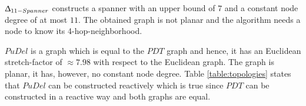$\Updelta _{11-Spanner} $ \cite{Kanj2012} constructs a spanner with an upper bound of $7 $ and a constant node degree of at most $11 $.
The obtained graph is not planar and the algorithm needs a node to know its 4-hop-neighborhood.

$PuDel $ \cite{Xu2011} is a graph which is equal to the $PDT $ graph \cite{Neumann2012} and hence, it has an Euclidean stretch-factor of $\approx 7.98 $ with respect to the Euclidean graph.
The graph is planar, it has, however, no constant node degree. 
Table \ref{table:topologies} states that $PuDel $ can be constructed reactively which is true since $PDT $ can be constructed in a reactive way and both graphs are equal.






